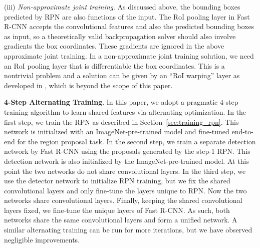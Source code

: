 \documentclass[10pt,journal,cspaper,compsoc]{IEEEtran}
\begin{document}
(iii) \emph{Non-approximate joint training}. As discussed above, the bounding boxes predicted by RPN are also functions of the input. The RoI pooling layer \cite{Girshick2015a} in Fast R-CNN accepts the convolutional features and also the predicted bounding boxes as input, so a theoretically valid backpropagation solver should also involve gradients \wrt the box coordinates. These gradients are ignored in the above approximate joint training.
In a non-approximate joint training solution, we need an RoI pooling layer that is differentiable \wrt the box coordinates.
This is a nontrivial problem and a solution can be given by an ``RoI warping'' layer as developed in \cite{Dai2015a}, which is beyond the scope of this paper.

\vspace{.5em}
\noindent\textbf{4-Step Alternating Training}. In this paper, we adopt a pragmatic 4-step training algorithm to learn shared features via alternating optimization.
In the first step, we train the RPN as described in Section~\ref{sec:training_rpn}. This network is initialized with an ImageNet-pre-trained model and fine-tuned end-to-end for the region proposal task.
In the second step, we train a separate detection network by Fast R-CNN using the proposals generated by the step-1 RPN. This detection network is also initialized by the ImageNet-pre-trained model. At this point the two networks do not share convolutional layers. In the third step, we use the detector network to initialize RPN training, but we fix the shared convolutional layers and only fine-tune the layers unique to RPN. Now the two networks share convolutional layers. Finally, keeping the shared convolutional layers fixed, we fine-tune the unique layers of Fast R-CNN. As such, both networks share the same convolutional layers and form a unified network. A similar alternating training can be run for more iterations, but we have observed negligible improvements.
\end{document}

